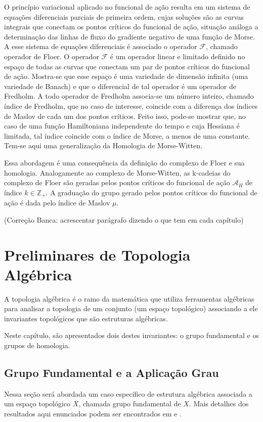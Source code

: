 \documentclass[12pt]{book}
\newcommand{\funcionalH}{\mathcal{A}_{H}}
\newcommand{\inteiros}{\mathbb{Z}}
\newcommand{\operadorFloer}{\mathcal{F}}
\newcommand{\alerta}[1]{{\color{red}#1}}
\newcommand{\correcaobanca}[1]{\alerta{(Correção Banca: #1)}}
\begin{document}
	O princípio variacional aplicado no funcional de ação resulta em um sistema de equações diferenciais parciais de primeira ordem, cujas soluções são as curvas integrais que conectam os pontos críticos do funcional de ação, situação análoga a determinação das linhas de fluxo do gradiente negativo de uma função de Morse. A esse sistema de equações diferenciais é associado o operador $\operadorFloer$, chamado operador de Floer. O operador $\operadorFloer$ é um operador linear e limitado 
	definido no espaço de todas as curvas que conectam um par de pontos críticos do funcional de ação. Mostra-se que esse espaço é uma variedade de dimensão infinita (uma variedade de Banach) e que o diferencial de tal operador é um operador de Fredholm. A todo operador de Fredholm associa-se um número inteiro, chamado índice de Fredholm, que no caso de interesse, coincide com a diferença dos índices de Maslov de cada um dos pontos críticos. Feito isso, pode-se mostrar que, no caso de uma função Hamiltoniana independente do tempo e cuja Hessiana é limitada, tal índice coincide com o índice de Morse, a menos de uma constante. Tem-se aqui uma generalização da Homologia de Morse-Witten.
	
	Essa abordagem é uma consequência da definição do complexo de Floer e sua homologia. Analogamente ao complexo de Morse-Witten, as k-cadeias do complexo de Floer são geradas pelos pontos críticos do funcional de ação $\funcionalH$ de índice $k \in \inteiros_{+}$. A graduação do grupo gerado pelos pontos críticos do funcional de ação é dada pelo índice de Maslov $\mu$.
	
	\correcaobanca{acrescentar parágrafo dizendo o que tem em cada capítulo}
	
	\chapter{Preliminares de Topologia Algébrica}
	A topologia algébrica é o ramo da matemática que utiliza ferramentas algébricas para analisar a topologia de um conjunto (um espaço topológico) associando a ele invariantes topológicos que são estruturas algébricas.
	
	Neste capítulo, são apresentados dois destes invariantes: o grupo fundamental e os grupos de homologia.
		
	\section{Grupo Fundamental e a Aplicação Grau}\label{capitulo_grupo_fundamental}
	Nessa seção será abordada um caso específico de estrutura algébrica associada a um espaço topológico $X$, chamada grupo fundamental de $X$. Mais detalhes dos resultados aqui enunciados podem ser encontrados em \cite{elon_grupo_fundamental} e \cite{massey}.
	
\end{document}
